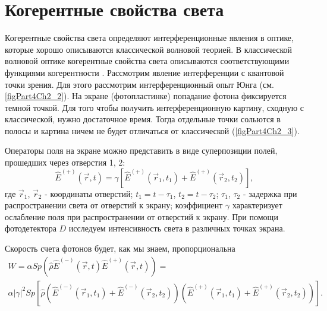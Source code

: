 \section{Когерентные свойства света}
Когерентные свойства света определяют интерференционные явления в
оптике, которые хорошо описываются классической волновой теорией. В
классической волновой оптике когерентные свойства света описываются
соответствующими функциями когерентности
\cite{bAhmanovNikitinPhysicalOptics2004, bMandel2000, bKilinQuantumOptics2003}.
Рассмотрим явление 
интерференции с квантовой точки зрения. Для этого рассмотрим
интерференционный опыт Юнга (см. \autoref{figPart4Ch2_2}). На экране
(фотопластинке) 
попадание фотона фиксируется темной точкой. Для того чтобы получить
интерференционную картину, сходную с классической, нужно достаточное
время. Тогда отдельные точки сольются в полосы и картина ничем не
будет отличаться от классической (\autoref{figPart4Ch2_3}). 





Операторы поля на экране можно представить в виде суперпозиции полей,
прошедших через отверстия 1, 2:
\begin{equation}
\hat{E}^{(+)}\left(\vec{r}, t\right) = 
\gamma \left[ 
\hat{E}^{(+)}\left(\vec{r}_1, t_1\right) +
\hat{E}^{(+)}\left(\vec{r}_2, t_2\right)
\right],
\label{eqCh4_11}
\end{equation}
где $\vec{r}_1$, $\vec{r}_2$ - координаты отверстий;  $t_1 = t -
\tau_1$,  $t_2 = t - \tau_2$;  $\tau_1$, $\tau_2$ - задержка при
распространении света от отверстий к экрану; коэффициент $\gamma$
характеризует ослабление поля при распространении от отверстий к
экрану. При помощи фотодетектора $D$ исследуем интенсивность света в
различных точках экрана.  

Скорость счета фотонов будет, как мы знаем, пропорциональна
\begin{eqnarray}
W = 
\alpha Sp\left(\hat{\rho}\hat{E}^{(-)}\left(\vec{r},
t\right)\hat{E}^{(+)}\left(\vec{r}, t\right)\right) = 
\nonumber \\
\alpha \left|\gamma\right|^2
Sp \left[\hat{\rho}
\left( 
\hat{E}^{(-)}\left(\vec{r}_1, t_1\right) +
\hat{E}^{(-)}\left(\vec{r}_2, t_2\right)
\right)
\left( 
\hat{E}^{(+)}\left(\vec{r}_1, t_1\right) +
\hat{E}^{(+)}\left(\vec{r}_2, t_2\right)
\right)
\right].
\nonumber
\end{eqnarray}

